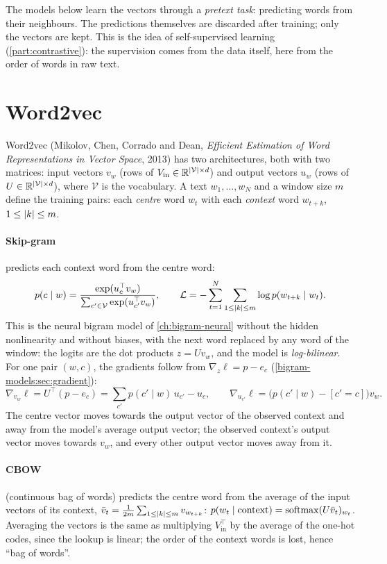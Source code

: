 \begin{notechapter}
The models below learn the vectors through a \emph{pretext task}: predicting words from their
neighbours. The predictions themselves are discarded after training; only the vectors are
kept. This is the idea of self-supervised learning (\cref{part:contrastive}): the
supervision comes from the data itself, here from the order of words in raw text.

\section{Word2vec}\label{word-embeddings:sec:word2vec}

Word2vec (Mikolov, Chen, Corrado and Dean, \emph{Efficient Estimation of Word Representations
in Vector Space}, 2013) has two architectures, both with two matrices: input vectors $v_w$ (rows
of $V_{\mathrm{in}}\in\mathbb{R}^{|\mathcal V|\times d}$) and output vectors $u_w$ (rows of $U\in\mathbb{R}^{|\mathcal V|\times d}$), where $\mathcal V$ is the vocabulary. A text $w_1,\dots,w_N$ and a window
size $m$ define the training pairs: each \emph{centre} word $w_t$ with each \emph{context} word $w_{t+k}$, $1\leq\left|k\right|\leq m$.

\paragraph{Skip-gram} predicts each context word from the centre word:
\[
  p(c\mid w) = \frac{\exp(u_c^\top v_w)}{\sum_{c'\in\mathcal V}\exp(u_{c'}^\top v_w)},\qquad
  \mathcal L = -\sum_{t=1}^N\sum_{1\leq\left|k\right|\leq m}\log p(w_{t+k}\mid w_t) .
\]
This is the neural bigram model of \cref{ch:bigram-neural} without the hidden nonlinearity and
without biases, with the next word replaced by any word of the window: the logits are the
dot products $z = Uv_w$, and the model is \emph{log-bilinear}. For one pair $(w, c)$, the gradients follow from
$\nabla_z\ell = p - e_c$ (\cref{bigram-models:sec:gradient}):
\[
  \nabla_{v_w}\ell = U^\top(p - e_c) = \sum_{c'}p(c'\mid w)\,u_{c'} - u_c,\qquad
  \nabla_{u_{c'}}\ell = \bigl(p(c'\mid w) - [c' = c]\bigr)v_w .
\]
The centre vector moves towards the output vector of the observed context and away from
the model's average output vector; the observed context's output vector moves towards
$v_w$, and every other output vector moves away from it.

\paragraph{CBOW} (continuous bag of words) predicts the centre word from the average of the
input vectors of its context, $\bar v_t = \frac1{2m}\sum_{1\leq\left|k\right|\leq m}v_{w_{t+k}}$:
$p(w_t\mid\text{context}) = \operatorname{softmax}(U\bar v_t)_{w_t}$. Averaging the vectors is the same as multiplying $V_{\mathrm{in}}^\top$ by the average of the
one-hot codes, since the lookup is linear; the order of the context words is lost, hence ``bag
of words''.


\end{notechapter}
